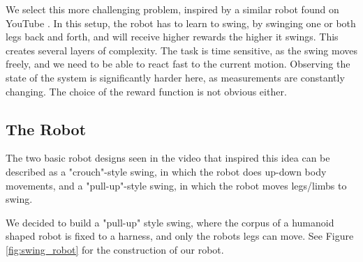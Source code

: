 \documentclass[11pt, a4paper]{article}
\begin{document}
	We select this more challenging problem, inspired by a similar robot found on YouTube \cite{youtube_swing}. In this setup, the robot has to learn to swing, by swinging one or both legs back and forth, and will receive higher rewards the higher it swings. This creates several layers of complexity. The task is time sensitive, as the swing moves freely, and we need to be able to react fast to the current motion. Observing the state of the system is significantly harder here, as measurements are constantly changing. The choice of the reward function is not obvious either.
	
	
	\subsection{The Robot}
	The two basic robot designs seen in the video that inspired this idea \cite{youtube_swing} can be described as a "crouch"-style swing, in which the robot does up-down body movements, and a "pull-up"-style swing, in which the robot moves legs/limbs to swing.
	
	We decided to build a "pull-up" style swing, where the corpus of a humanoid shaped robot is fixed to a harness, and only the robots legs can move. See Figure \ref{fig:swing_robot} for the construction of our robot.
	
\end{document}
